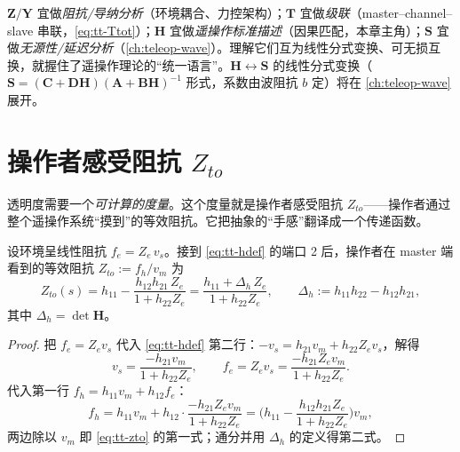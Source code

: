 \begin{insight}[各参数化的分工]\label{ins:tt-param-roles}
$\mathbf Z/\mathbf Y$ 宜做\emph{阻抗/导纳分析}（环境耦合、力控架构）；$\mathbf T$ 宜做\emph{级联}（master--channel--slave 串联，\cref{eq:tt-Ttot}）；$\mathbf H$ 宜做\emph{遥操作标准描述}（因果匹配，本章主角）；$\mathbf S$ 宜做\emph{无源性/延迟分析}（\cref{ch:teleop-wave}）。理解它们互为线性分式变换、可无损互换，就握住了遥操作理论的“统一语言”。$\mathbf H\leftrightarrow\mathbf S$ 的线性分式变换（$\mathbf S=(\mathbf C+\mathbf D\mathbf H)(\mathbf A+\mathbf B\mathbf H)^{-1}$ 形式，系数由波阻抗 $b$ 定）将在 \cref{ch:teleop-wave} 展开。
\end{insight}

\section{操作者感受阻抗 \texorpdfstring{$Z_{to}$}{Zto}}
\label{sec:tt-zto}

透明度需要一个\emph{可计算的度量}。这个度量就是操作者感受阻抗 $Z_{to}$——操作者通过整个遥操作系统“摸到”的等效阻抗。它把抽象的“手感”翻译成一个传递函数。

\begin{theorem}[操作者感受阻抗]\label{thm:tt-zto}
设环境呈线性阻抗 $f_e=Z_e\,v_s$。接到 \cref{eq:tt-hdef} 的端口 2 后，操作者在 master 端看到的等效阻抗 $Z_{to}:=f_h/v_m$ 为
\begin{equation}
  Z_{to}(s)=h_{11}-\frac{h_{12}h_{21}\,Z_e}{1+h_{22}Z_e}
  =\frac{h_{11}+\Delta_h\,Z_e}{1+h_{22}Z_e},
  \qquad \Delta_h:=h_{11}h_{22}-h_{12}h_{21},
  \label{eq:tt-zto}
\end{equation}
其中 $\Delta_h=\det\mathbf H$。
\end{theorem}
\begin{proof}
把 $f_e=Z_e v_s$ 代入 \cref{eq:tt-hdef} 第二行：$-v_s=h_{21}v_m+h_{22}Z_e v_s$，解得
\begin{equation}
  v_s=\frac{-h_{21}v_m}{1+h_{22}Z_e},\qquad
  f_e=Z_e v_s=\frac{-h_{21}Z_e v_m}{1+h_{22}Z_e}.
\end{equation}
代入第一行 $f_h=h_{11}v_m+h_{12}f_e$：
\begin{equation}
  f_h=h_{11}v_m+h_{12}\cdot\frac{-h_{21}Z_e v_m}{1+h_{22}Z_e}
     =\Big(h_{11}-\frac{h_{12}h_{21}Z_e}{1+h_{22}Z_e}\Big)v_m,
\end{equation}
两边除以 $v_m$ 即 \cref{eq:tt-zto} 的第一式；通分并用 $\Delta_h$ 的定义得第二式。
\end{proof}

